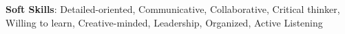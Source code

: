 \textbf{Soft Skills}: Detailed-oriented, Communicative, Collaborative, Critical thinker, Willing to learn, Creative-minded, Leadership, Organized, Active Listening